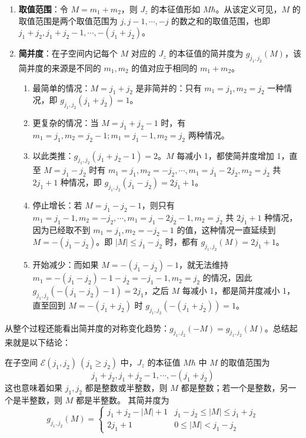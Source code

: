 \documentclass[cn,10pt,math=newtx,citestyle=gb7714-2015,bibstyle=gb7714-2015]{elegantbook}
\def\ms{\mathscr}
\begin{document}
\begin{enumerate}
    \item \textbf{取值范围}：令 $M = m_1+m_2$，则 $J_z$ 的本征值形如 $M\hbar$。从该定义可见，$M$ 的取值范围是两个取值范围为 $j,j-1,\cdots,-j$ 的数之和的取值范围，也即
 $j_1+j_2,j_1+j_2-1,\cdots,-(j_1+j_2)$。
    \item \textbf{简并度}：在子空间内记每个 $M$ 对应的 $J_z$ 的本征值的简并度为 $g_{j_1,j_2}(M)$，该简并度的来源是不同的 $m_1,m_2$ 的值对应于相同的 $m_1+m_2$。
    \begin{enumerate}
        \item 最简单的情况：$M=j_1+j_2$ 是非简并的：只有 $m_1=j_1,m_2=j_2$ 一种情况，即 $g_{j_1,j_2}(j_1+j_2)=1$。
        \item 更复杂的情况：当 $M=j_1+j_2-1$ 时，有 $m_1=j_1,m_2=j_2-1;m_1=j_1-1,m_2=j_2$ 两种情况。
        \item 以此类推：$g_{j_1,j_2}(j_1+j_2-1)=2$。$M$ 每减小 1，都使简并度增加 1，直至 $M=j_1-j_2$ 时有 $m_1=j_1,m_2 = -j_2,\cdots,m_1=j_1-2j_2,m_2=j_2$ 共 $2j_1+1$ 种情况，即 $g_{j_1,j_2}(j_1-j_2)=2j_1+1$。
        \item 停止增长：若 $M=j_1-j_2-1$，则只有 $m_1=j_1-1,m_2 = -j_2,\cdots,m_1=j_1-2j_2-1,m_2=j_2$ 共 $2j_1+1$ 种情况，因为已经取不到 $m_1=j_1,m_2=-j_2-1$ 的值，这种情况一直延续到 $M=-(j_1-j_2)$。即 $|M|\le j_1-j_2$ 时，都有 $g_{j_1,j_2}(M)=2j_1+1$。
        \item 开始减少：而如果 $M=-(j_1-j_2)-1$，就无法维持 $m_1=-(j_1-j_2)-1-j_2 = -j_1-1,m_2=j_2$ 的情况，因此 $g_{j_1,j_2}(-(j_1-j_2)-1)=2j_1$，之后 $M$ 每减小 1，都是简并度减小 1，直至回到 $M=-(j_1+j_2)$ 时 $g_{j_1,j_2}(-(j_1+j_2))=1$。
    \end{enumerate}
\end{enumerate}

 从整个过程还能看出简并度的对称变化趋势：$g_{j_1,j_2}(-M) = g_{j_1,j_2}(M)$。总结起来就是以下结论：
\begin{theorem}[$J_z$ 的本征值及其简并度]
   在子空间 $\ms E(j_1,j_2)\ (j_1\ge j_2)$ 中，$J_z$ 的本征值 $M\hbar$ 中 $M$ 的取值范围为
   \begin{equation*}
       j_1+j_2,j_1+j_2-1,\cdots,-(j_1+j_2)
   \end{equation*}
   这也意味着如果 $j_1,j_2$ 都是整数或半整数，则 $M$ 都是整数；若一个是整数，另一个是半整数，则 $M$ 都是半整数。
   其简并度为
   \begin{equation}
       g_{j_1,j_2}(M) = \begin{cases}
           j_1+j_2-|M|+1 & j_1-j_2\le |M|\le j_1+j_2\\
           2j_1+1 & 0 \le |M| < j_1-j_2
       \end{cases}
   \end{equation}
\end{theorem}
\end{document}
